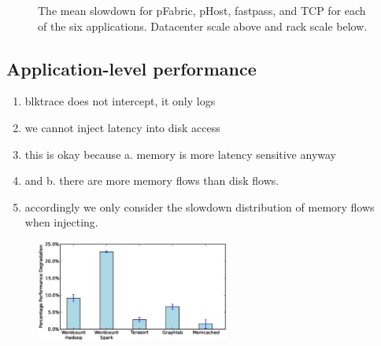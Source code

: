 %
\begin{figure}
  \centering
  \caption{\small{The mean slowdown for pFabric, pHost, fastpass, and TCP for each of the six applications. Datacenter scale above and rack scale below.}}
  \label{fig:phostp}
\end{figure}
%

\subsection{Application-level performance}

\begin{enumerate}
\item blktrace does not intercept, it only logs
\item we cannot inject latency into disk access
\item this is okay because a. memory is more latency sensitive anyway 
\item and b. there are more memory flows than disk flows.
\item accordingly we only consider the slowdown distribution of memory flows when injecting.
\end{enumerate}
\label{ssec:alp}

%
\begin{figure}
  \centering
    \includegraphics[width = 2.5in]{img/slowdown.eps} 
  \caption{\small{}}
  \label{fig:appfabric}
\end{figure}
%
